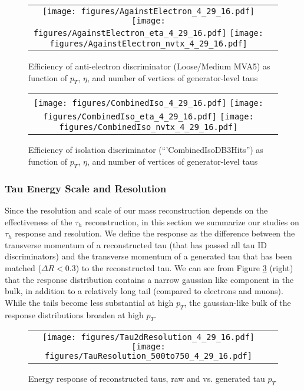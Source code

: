 \begin{figure}[tbh!]
    \centering
    \begin{tabular}{cc}
      \texttt{[image: figures/AgainstElectron\_4\_29\_16.pdf]}
      \texttt{[image: figures/AgainstElectron\_eta\_4\_29\_16.pdf]}
       \texttt{[image: figures/AgainstElectron\_nvtx\_4\_29\_16.pdf]}
    \end{tabular}
    \caption{Efficiency of anti-electron discriminator (Loose/Medium MVA5) as function of $p_{T}$, $\eta$, and number of vertices of generator-level taus }
    \label{fig:EM5}
  \end{figure}

\begin{figure}[tbh!]
    \centering
    \begin{tabular}{cc}
      \texttt{[image: figures/CombinedIso\_4\_29\_16.pdf]}
      \texttt{[image: figures/CombinedIso\_eta\_4\_29\_16.pdf]}
       \texttt{[image: figures/CombinedIso\_nvtx\_4\_29\_16.pdf]}
    \end{tabular}
    \caption{Efficiency of isolation discriminator (``'CombinedIsoDB3Hits'') as function of $p_{T}$, $\eta$, and number of vertices of generator-level taus }
    \label{fig:TIso}
  \end{figure}



\subsubsection{Tau Energy Scale and Resolution}

Since the resolution and scale of our mass reconstruction depends on the effectiveness of the $\tau_{h}$ reconstruction, in this section we summarize our studies on $\tau_{h}$ response and resolution. We define the response as the difference between the transverse momentum of a reconstructed tau (that has passed all tau ID discriminators) and the transverse momentum of a generated tau that has been matched ($\Delta R < 0.3$) to the reconstructed tau. We can see from Figure \ref{fig:Tau2dResolution} (right) that the response distribution contains a narrow gaussian like component in the bulk, in addition to a relatively long tail (compared to electrons and muons). While the tails become less substantial at high $p_{T}$, the gaussian-like bulk of the response distributions broaden at high $p_{T}$.
 
\begin{figure}[tbh!]
  \centering
  \begin{tabular}{cc}
  \texttt{[image: figures/Tau2dResolution\_4\_29\_16.pdf]}
  \texttt{[image: figures/TauResolution\_500to750\_4\_29\_16.pdf]}
  \end{tabular}
  \caption{Energy response of reconstructed taus, raw and vs. generated tau $p_{T}$}
  \label{fig:Tau2dResolution}
\end{figure}


